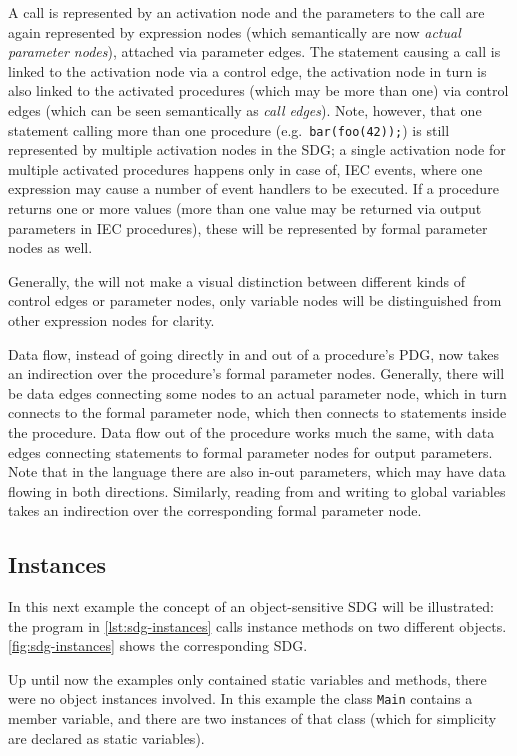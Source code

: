 A call is represented by an activation node and the parameters to the call are again represented by expression nodes 
(which semantically are now\emph{ actual parameter nodes}), attached via parameter edges. The statement causing a call 
is linked to the activation node via a control edge, the activation node in turn is also linked to the activated 
procedures (which may be more than one) via control edges (which can be seen semantically as \emph{call edges}). Note, 
however, that one statement calling more than one procedure (e.g.\ \lstinline|bar(foo(42));|) is still represented by 
multiple activation nodes in the SDG; a single activation node for multiple activated procedures happens only in case 
of, IEC events, where one expression may cause a number of event handlers to be executed. If a procedure returns one or 
more values (more than one value may be returned via output parameters in IEC procedures), these will be represented by 
formal parameter nodes as well.

Generally, the \SB will not make a visual distinction between different kinds of control edges or parameter nodes, only 
variable nodes will be distinguished from other expression nodes for clarity.

Data flow, instead of going directly in and out of a procedure's PDG, now takes an indirection over the procedure's 
formal parameter nodes. Generally, there will be data edges connecting some nodes to an actual parameter node, which in 
turn connects to the formal parameter node, which then connects to statements inside the procedure. Data flow out of 
the procedure works much the same, with data edges connecting statements to formal parameter nodes for output 
parameters. Note that in the \IEC language there are also in-out parameters, which may have data flowing in both 
directions. Similarly, reading from and writing to global variables takes an indirection over the corresponding formal 
parameter node.



\subsection{Instances}

In this next example the concept of an object-sensitive SDG will be illustrated: the program in 
\autoref{lst:sdg-instances} calls instance methods on two different objects. \autoref{fig:sdg-instances} shows the 
corresponding SDG.

Up until now the examples only contained static variables and methods, there were no object instances involved. In this 
example the class \lstinline|Main| contains a member variable, and there are two instances of that class (which for 
simplicity are declared as static variables).

